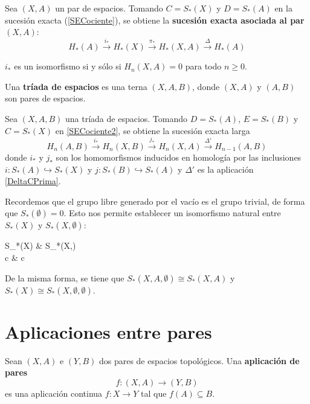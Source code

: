 \begin{definition}
Sea $(X,A)$ un par de espacios. Tomando $C=S_*(X)$ y $D=S_*(A)$ en la
sucesión exacta (\ref{SECociente}), se obtiene la \textbf{sucesión exacta
asociada al par $(X,A)$}:
\[H_*(A) \xrightarrow{i_*} H_*(X) \xrightarrow{\pi_*} H_*(X,A)
\xrightarrow{\Delta} H_*(A)\]
\end{definition}

\begin{proposition}
$i_*$ es un isomorfismo si y sólo si $H_n(X,A)=0$ para todo $n \geq 0$.
\end{proposition}

Una \textbf{tríada de espacios} es una terna $(X,A,B)$, donde $(X,A)$ y
$(A,B)$ son pares de espacios.

Sea $(X,A,B)$ una tríada de espacios. Tomando $D=S_*(A)$, $E=S_*(B)$ y
$C=S_*(X)$ en \eqref{SECociente2}, se obtiene la sucesión exacta larga
\[H_n(A,B) \xrightarrow{i_*} H_n(X,B) \xrightarrow{j_*} H_n(X,A)
\xrightarrow{\Delta'} H_{n-1}(A,B)\]
donde $i_*$ y $j_*$ son los homomorfismos inducidos en homología por las
inclusiones $i\colon S_*(A) \hookrightarrow S_*(X)$ y $j\colon S_*(B)
\hookrightarrow S_*(A)$ y $\Delta'$ es la aplicación \eqref{DeltaCPrima}.

Recordemos que el grupo libre generado por el vacío es el grupo trivial, de
forma que $S_*(\emptyset)=0$. Esto nos permite establecer un isomorfismo
natural entre $S_*(X)$ y $S_*(X,\emptyset)$:
\begin{diag}
S_*(X) \arrow[r] & S_*(X,\emptyset)\\[-8mm]
c \arrow[r, maps to] & \overline c
\end{diag}
De la misma forma, se tiene que $S_*(X,A,\emptyset) \cong S_*(X,A)$ y
$S_*(X)\cong S_*(X,\emptyset,\emptyset)$.

\section{Aplicaciones entre pares}
\begin{definition}
Sean $(X,A)$ e $(Y,B)$ dos pares de espacios topológicos. Una
\textbf{aplicación de pares}
\[f\colon (X,A) \longrightarrow (Y,B)\]
es una aplicación continua $f\colon X \longrightarrow Y$ tal que $f(A)
\subseteq B$.
\end{definition}


